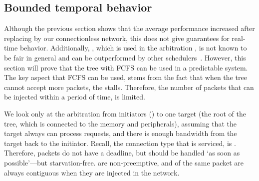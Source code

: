 
\subsection{Bounded temporal behavior}
\label{s:hardware:warpfield:predictability}

Although the previous section shows that the average performance increased after replacing \aethereal by our connectionless network, this does not give guarantees for real-time behavior.
Additionally, , which is used in the arbitration , is not known to be fair in general and can be outperformed by other schedulers~\cite{zhang:service_disciplines}.
However, this section will prove that the tree with \ac{FCFS} can be used in a predictable system.
The key aspect that \ac{FCFS} can be used, stems from the fact that when the tree cannot accept more packets, the \MicroBlaze stalls.
Therefore, the number of packets that can be injected within a period of time, is limited.

We look only at the arbitration from \SYMcorecount* initiators (\MicroBlazes) to one target (the root of the tree, which is connected to the memory and peripherals), assuming that the target always can process requests, and there is enough bandwidth from the target back to the initiator.
Recall, the connection type that is serviced, is .
Therefore, packets do not have a deadline, but should be handled `as soon as possible'---but starvation-free.
 are non-preemptive, and  of the same packet are always contiguous when they are injected in the network.

